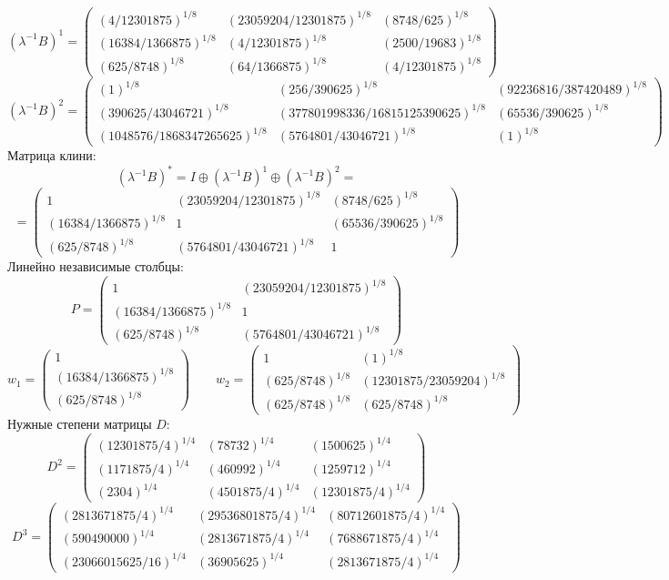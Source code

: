 $$(\lambda^{-1}B)^1 = \begin{pmatrix}
(4/12301875)^{1/8} & (23059204/12301875)^{1/8} & (8748/625)^{1/8}\\
(16384/1366875)^{1/8} & (4/12301875)^{1/8} & (2500/19683)^{1/8}\\
(625/8748)^{1/8} & (64/1366875)^{1/8} & (4/12301875)^{1/8}
\end{pmatrix}
$$
$$(\lambda^{-1}B)^2 = \begin{pmatrix}
(1)^{1/8} & (256/390625)^{1/8} & (92236816/387420489)^{1/8}\\
(390625/43046721)^{1/8} & (377801998336/16815125390625)^{1/8} & (65536/390625)^{1/8}\\
(1048576/1868347265625)^{1/8} & (5764801/43046721)^{1/8} & (1)^{1/8}
\end{pmatrix}
$$
Матрица клини:
$$(\lambda^{-1}B)^* = I \oplus (\lambda^{-1}B)^1 \oplus (\lambda^{-1}B)^2 = $$
$$ = \begin{pmatrix}
1 & (23059204/12301875)^{1/8} & (8748/625)^{1/8}\\
(16384/1366875)^{1/8} & 1 & (65536/390625)^{1/8}\\
(625/8748)^{1/8} & (5764801/43046721)^{1/8} & 1
\end{pmatrix}
$$
Линейно независимые столбцы:
$$P = \begin{pmatrix}
1 & (23059204/12301875)^{1/8}\\
(16384/1366875)^{1/8} & 1\\
(625/8748)^{1/8} & (5764801/43046721)^{1/8}
\end{pmatrix}
$$
$$w_1 = \begin{pmatrix}
1\\
(16384/1366875)^{1/8}\\
(625/8748)^{1/8}
\end{pmatrix}
\qquad w_2 = \begin{pmatrix}
1 & (1)^{1/8}\\
(625/8748)^{1/8} & (12301875/23059204)^{1/8}\\
(625/8748)^{1/8} & (625/8748)^{1/8}
\end{pmatrix}
$$
Нужные степени матрицы $D$:
$$D^2 = \begin{pmatrix}
(12301875/4)^{1/4} & (78732)^{1/4} & (1500625)^{1/4}\\
(1171875/4)^{1/4} & (460992)^{1/4} & (1259712)^{1/4}\\
(2304)^{1/4} & (4501875/4)^{1/4} & (12301875/4)^{1/4}
\end{pmatrix}
$$
$$D^3 = \begin{pmatrix}
(2813671875/4)^{1/4} & (29536801875/4)^{1/4} & (80712601875/4)^{1/4}\\
(590490000)^{1/4} & (2813671875/4)^{1/4} & (7688671875/4)^{1/4}\\
(23066015625/16)^{1/4} & (36905625)^{1/4} & (2813671875/4)^{1/4}
\end{pmatrix}
$$
